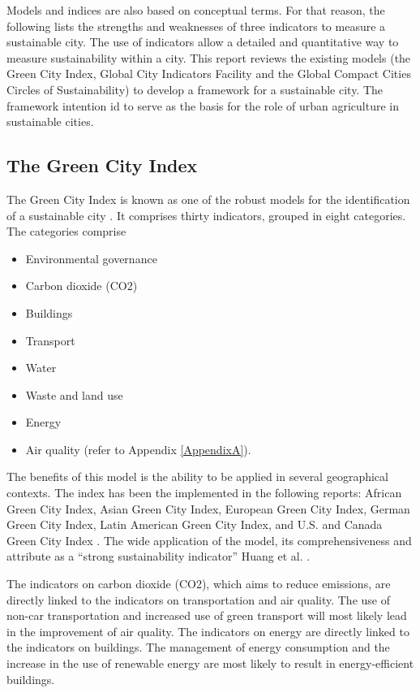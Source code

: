 Models and indices are also based on conceptual terms. For that reason, the following lists the strengths and weaknesses of three indicators to measure a sustainable city. The use of indicators allow a detailed and quantitative way to measure sustainability within a city. This report reviews the existing models (the Green City Index, Global City Indicators Facility and the Global Compact Cities Circles of Sustainability) to develop a framework for a sustainable city. The framework intention id to serve as the basis for the role of urban agriculture in sustainable cities.

\subsection{The Green City Index}

The Green City Index is known as one of the robust models for the identification of a sustainable city \cite{Huang2015}. It comprises thirty indicators, grouped in eight categories. The categories comprise

\begin{itemize}
    \item Environmental governance
    \item Carbon dioxide (CO2)
    \item Buildings
    \item Transport
    \item Water
    \item Waste and land use
    \item Energy
    \item Air quality (refer to Appendix \ref{AppendixA}).
\end{itemize}

The benefits of this model is the ability to be applied in several geographical contexts. The index has been the implemented in the following reports: African Green City Index, Asian Green City Index, European Green City Index, German Green City Index, Latin American Green City Index, and U.S. and Canada Green City Index \cite{Huang2015}. The wide application of the model, its comprehensiveness and attribute as a “strong sustainability indicator” Huang et al. \cite{Huang2015}.

The indicators on carbon dioxide (CO2), which aims to reduce emissions, are directly linked to the indicators on transportation and air quality. The use of non-car transportation and increased use of green transport will most likely lead in the improvement of air quality. The indicators on energy are directly linked to the indicators on buildings. The management of energy consumption and the increase in the use of renewable energy are most likely to result in energy-efficient buildings.


